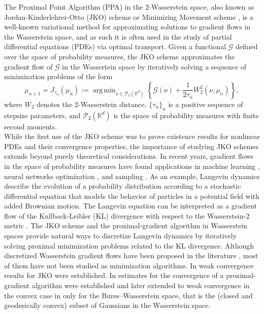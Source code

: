 \documentclass[11pt]{article}
\DeclareMathOperator*{\argmin}{arg\,min}
\newcommand{\cG}{\mathcal{G}}
\numberwithin{equation}{section}
\begin{document}
The Proximal Point Algorithm (PPA) in the $2$-Wasserstein space, also known as Jordan-Kinderlehrer-Otto (JKO) scheme \cite{JKO98} or Minimizing Movement scheme \cite{AGS08,DeGiorgi93}, is a well-known variational method for approximating solutions to gradient flows in the Wasserstein space, and as such it is often used in the study of partial differential equations (PDEs) via optimal transport. Given a functional $\cG$ defined over the space of probability measures, the JKO scheme approximates the gradient flow of $\cG$ in the Wassertein space by iteratively solving a sequence of minimization problems of the form
\begin{equation}\label{eq:prox_point_intro}
	\mu_{n+1} = J_{\tau_n}(\mu_n) := \argmin_{\nu \in \mathcal{P}_2(\mathbb{R}^d)} \left\{ \cG(\nu) + \frac{1}{2\tau_n} W_2^2(\nu, \mu_n) \right\},
\end{equation}
where $ W_2 $ denotes the 2-Wasserstein distance, $\{ \tau_n \}_n$ is a positive sequence of stepsize parameters, and $ \mathcal{P}_2(\mathbb{R}^d) $ is the space of probability measures with finite second moments.\\
While the first use of the JKO scheme was to prove existence results for nonlinear PDEs and their convergence properties, the importance of studying JKO schemes extends beyond purely theoretical considerations. In recent years, gradient flows in the space of probability measures have found applications in machine learning \cite{RM17,ZCL18}, neural networks
optimization \cite{ChizatBach18,MMM19,LLOM21}, and sampling \cite{Bernton18,CB18,DMM18,Wibisono18}. As an example, Langevin dynamics describe the evolution of a probability distribution according to a stochastic differential equation that models the behavior of particles in a potential field with added Brownian motion. The Langevin equation can be interpreted as a gradient flow of the Kullback-Leibler (KL) divergence with respect to the Wasserstein-2 metric \cite{Wibisono18}. The JKO scheme and the proximal-gradient algorithm in Wasserstein spaces \cite{WPG2020} provide natural ways to discretize Langevin dynamics by iteratively solving proximal minimization problems related to the KL divergence.
Although discretized Wasserstein gradient flows have been proposed in the literature \cite{AGS08,Bowles15,CL17,JKO98,MRV11,Wibisono18}, most of them have not been studied as minimization algorithms. In \cite{NS2021} weak convergence results for JKO were established. In \cite{WPG2020} estimates for the convergence of a proximal-gradient algorithm were established and later extended to weak convergence in the convex case in \cite{diao2023} only for the Bures–Wasserstein space, that is the (closed and geodesically convex) subset of Gaussians in the Wasserstein space.
\end{document}
